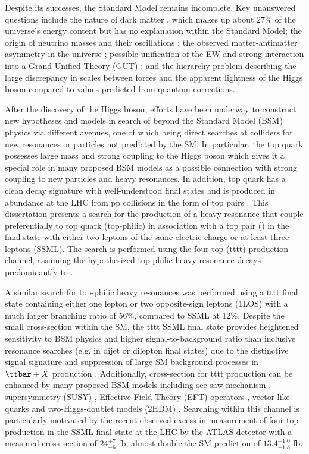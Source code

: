 \documentclass[../thesis.tex]{subfiles}
\begin{document}
Despite its successes, the Standard Model remains incomplete. Key unanswered questions include the nature of dark matter \tocite, which makes up about 27\% of the universe’s energy content but has no explanation within the Standard Model; the origin of neutrino masses and their oscillations \tocite; the observed matter-antimatter asymmetry in the universe \tocite; possible unification of the \acs{EW} and strong interaction into a Grand Unified Theory (\acs{GUT}) \tocite; and the hierarchy problem \tocite describing the large discrepancy in scales between forces and the apparent lightness of the Higgs boson compared to values predicted from quantum corrections. 

After the discovery of the Higgs boson, efforts have been underway to construct new hypotheses and models in search of beyond the Standard Model (\acs{BSM}) physics via different avenues, one of which being direct searches at colliders for new resonances or particles not predicted by the \acs{SM}. In particular, the top quark possesses large mass and strong coupling to the Higgs boson \citep{theory:top_coupling} which gives it a special role in many proposed \acs{BSM} models as a possible connection with strong coupling to new particles and heavy resonances. In addition, top quark has a clean decay signature with well-understood final states and is produced in abundance at the \acs{LHC} from \acs{pp} collisions in the form of top pairs \ttbar \tocite. This dissertation presents a search for the production of a heavy resonance that couple preferentially to top quark (top-philic) in association with a top pair (\ttbar) in the final state with either two leptons of the same electric charge or at least three leptons (\acs{SSML}). The search is performed using the four-top (\acs{tttt}) production channel, assuming the hypothesized top-philic heavy resonance decays predominantly to \ttbar.

A similar search for top-philic heavy resonances was performed using a \acs{tttt} final state containing either one lepton or two opposite-sign leptons (\acs{1LOS}) \citep{theory:ttZp_1los} with a much larger branching ratio of 56\%, compared to \acs{SSML} at 12\%. Despite the small cross-section within the \acs{SM}, the \acs{tttt} \acs{SSML} final state provides heightened sensitivity to \acs{BSM} physics and higher signal-to-background ratio than inclusive resonance searches (e.g. in dijet or dilepton final states) due to the distinctive signal signature and suppression of large \acs{SM} background processes in $\ttbar+X$ production \tocite. Additionally, cross-section for \acs{tttt} production can be enhanced by many proposed \acs{BSM} models including see-saw mechanism \tocite, supersymmetry (SUSY) \tocite, Effective Field Theory (EFT) operators \tocite, vector-like quarks \tocite and two-Higgs-doublet models (2HDM) \tocite. Searching within this channel is particularly motivated by the recent observed excess in measurement of four-top production in the \acs{SSML} final state at the \acs{LHC} by the \acs{ATLAS} detector \citep{tttt_obs} with a measured cross-section of $24^{+7}_{-6}$ fb, almost double the \acs{SM} prediction of $13.4^{+1.0}_{-1.8}$ fb.
\end{document}
